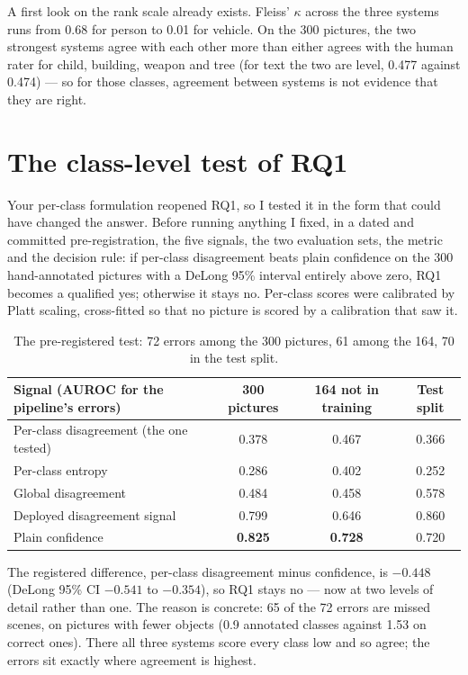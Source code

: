 \documentclass[11pt,a4paper]{article}
\begin{document}
A first look on the rank scale already exists. Fleiss' $\kappa$ across the three systems runs from 0.68
for person to 0.01 for vehicle. On the 300 pictures, the two strongest systems agree with each other
more than either agrees with the human rater for child, building, weapon and tree (for text the two
are level, 0.477 against 0.474) --- so for those classes, agreement between systems is not evidence
that they are right.

\section{The class-level test of RQ1}

Your per-class formulation reopened RQ1, so I tested it in the form that could have changed the answer.
Before running anything I fixed, in a dated and committed pre-registration, the five signals, the two
evaluation sets, the metric and the decision rule: if per-class disagreement beats plain confidence on
the 300 hand-annotated pictures with a DeLong 95\% interval entirely above zero, RQ1 becomes a qualified
yes; otherwise it stays no. Per-class scores were calibrated by Platt scaling, cross-fitted so that no
picture is scored by a calibration that saw it.

\begin{table}[h]
\centering
\small
\begin{tabular}{lccc}
\toprule
Signal (AUROC for the pipeline's errors) & 300 pictures & 164 not in training & Test split \\
\midrule
Per-class disagreement (the one tested) & 0.378 & 0.467 & 0.366 \\
Per-class entropy & 0.286 & 0.402 & 0.252 \\
Global disagreement & 0.484 & 0.458 & 0.578 \\
Deployed disagreement signal & 0.799 & 0.646 & 0.860 \\
Plain confidence & \textbf{0.825} & \textbf{0.728} & 0.720 \\
\bottomrule
\end{tabular}
\caption{The pre-registered test: 72 errors among the 300 pictures, 61 among the 164, 70 in the test split.}
\end{table}

The registered difference, per-class disagreement minus confidence, is $-0.448$ (DeLong 95\% CI
$-0.541$ to $-0.354$), so RQ1 stays no --- now at two levels of detail rather than one. The reason is
concrete: 65 of the 72 errors are missed scenes, on pictures with fewer objects (0.9 annotated classes
against 1.53 on correct ones). There all three systems score every class low and so agree; the errors sit
exactly where agreement is highest.
\end{document}

